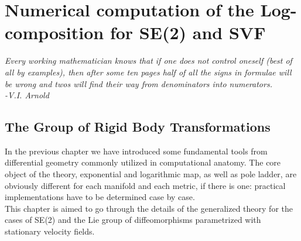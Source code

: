 \chapter{Numerical computation of the Log-composition for SE(2) and SVF}\label{ch:spatial_transformations}


\begin{flushright}
	\emph{Every working mathematician knows that if one does not control oneself (best of all by examples), then after some ten pages half of all the signs in formulae will be wrong and twos will find their way from denominators into numerators. \\ -V.I. Arnold}
\end{flushright}


\section{The Group of Rigid Body Transformations}\label{se:rigid_body_transformations}

In the previous chapter we have introduced some fundamental tools from differential geometry commonly utilized in computational anatomy. The core object of the theory, exponential and logarithmic map, as well as pole ladder, are obviously different for each manifold and each metric, if there is one: practical implementations have to be determined case by case.\\
This chapter is aimed to go through the details of the generalized theory for the cases of SE(2) and the Lie group of diffeomorphisms parametrized with stationary velocity fields.


%



